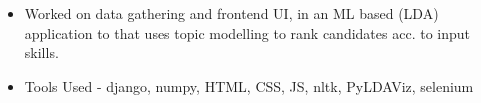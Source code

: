 \begin{itemize}
\item Worked on data gathering and frontend UI, in an ML based (LDA) application to that uses topic modelling to rank candidates acc. to input skills.
\item Tools Used -  django, numpy, HTML, CSS, JS, nltk, PyLDAViz, selenium
\end{itemize}




